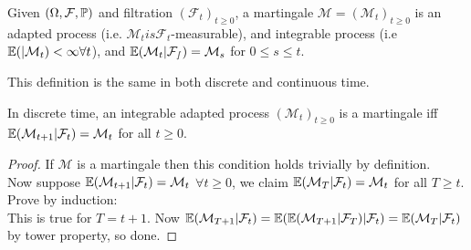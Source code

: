 \documentclass[a4paper]{article}
\begin{document}
\begin{defi}
    Given $(\Omega,\mathcal{F},\P)$ and filtration $(\mathcal{F}_t)_{t \geq 0}$, a martingale $\mathcal{M} =(\mathcal{M}_t)_{t \geq 0}$ is an adapted process (i.e. $\mathcal{M}_t is \mathcal{F}_t$-measurable), and integrable process (i.e $\E(|\mathcal{M}_t)<\infty \forall t$), and $\E(\mathcal{M}_t|\mathcal{F_s}) =\mathcal{M}_s$ for $0 \leq s \leq t$.
\end{defi}

\begin{rem}
    This definition is the same in both discrete and continuous time.
\end{rem}

\begin{prop}
In discrete time, an integrable adapted process $(\mathcal{M}_t)_{t \geq 0}$ is a martingale iff $\E(\mathcal{M}_{t+1}|\mathcal{F}_t) = \mathcal{M}_t$ for all $t \geq 0$.
\begin{proof}
    If $\mathcal{M}$ is a martingale then this condition holds trivially by definition.\\
    Now suppose $\E(\mathcal{M}_{t+1}|\mathcal{F}_t) = \mathcal{M}_t$ $\forall t \geq 0$, we claim $\E(\mathcal{M}_T | \mathcal{F}_t) = \mathcal{M}_t$ for all $T \geq t$. Prove by induction:\\
    This is true for $T=t+1$. Now $\E(\mathcal{M}_{T+1}|\mathcal{F}_t) = \E(\E(\mathcal{M}_{T+1}|\mathcal{F}_T)|\mathcal{F}_t) = \E(\mathcal{M}_T|\mathcal{F}_t)$ by tower property, so done.
\end{proof}
\end{prop}
\end{document}
